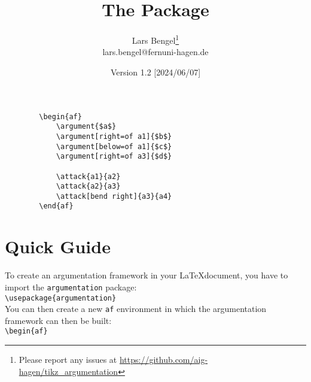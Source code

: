 \documentclass{article}
\title{The \argumentation Package}
\author{Lars Bengel\footnote{Please report any issues at \url{https://github.com/aig-hagen/tikz_argumentation}}\\\small lars.bengel@fernuni-hagen.de}
\date{Version 1.2 [2024/06/07]}
\newcommand{\argumentation}{\texttt{argumentation}\xspace}
\begin{document}
\maketitle

\begin{minipage}{.28\textwidth}
    \centering
        \begin{af}
    
        \end{af}
\end{minipage}
\begin{minipage}{.5\textwidth}
    \begin{verbatim}
        \begin{af}
            \argument{$a$}
            \argument[right=of a1]{$b$}
            \argument[below=of a1]{$c$}
            \argument[right=of a3]{$d$}
    
            \attack{a1}{a2}
            \attack{a2}{a3}
            \attack[bend right]{a3}{a4}
        \end{af}
    \end{verbatim}
\end{minipage}


\tableofcontents
\newpage

\section{Quick Guide}\label{sec:quick}

\noindent
To create an argumentation framework in your \LaTeX document, you have to import the \argumentation package:\\

\vspace{-0.3cm}
\verb|\usepackage{argumentation}|\\

\noindent
You can then create a new \texttt{af} environment in which the argumentation framework can then be built:\\

\vspace{-0.3cm}
\verb|\begin{af}|
\end{document}
